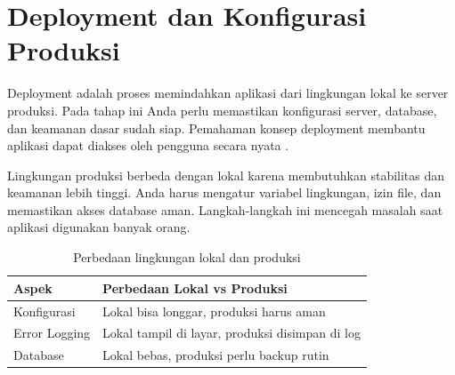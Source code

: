 \section{Deployment dan Konfigurasi Produksi}
Deployment adalah proses memindahkan aplikasi dari lingkungan lokal ke server produksi. Pada tahap ini Anda perlu memastikan konfigurasi server, database, dan keamanan dasar sudah siap. Pemahaman konsep deployment membantu aplikasi dapat diakses oleh pengguna secara nyata \cite{mdnDeploy}.

Lingkungan produksi berbeda dengan lokal karena membutuhkan stabilitas dan keamanan lebih tinggi. Anda harus mengatur variabel lingkungan, izin file, dan memastikan akses database aman. Langkah-langkah ini mencegah masalah saat aplikasi digunakan banyak orang.

\begin{table}[ht]
\centering
\begin{tabular}{|P{4cm}|P{7cm}|}
\hline
\textbf{Aspek} & \textbf{Perbedaan Lokal vs Produksi} \\
\hline
Konfigurasi & Lokal bisa longgar, produksi harus aman \\
\hline
Error Logging & Lokal tampil di layar, produksi disimpan di log \\
\hline
Database & Lokal bebas, produksi perlu backup rutin \\
\hline
\end{tabular}
\caption{Perbedaan lingkungan lokal dan produksi}
\end{table}


